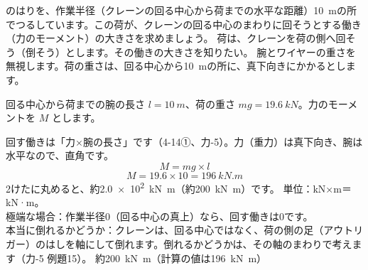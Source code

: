 \begin{phreidai}[腕の根もとを回す働き]\label{ph:力-0:ex3}
のはりを、作業半径（クレーンの回る中心から荷までの水平な距離）\qty{10}{m}の所でつるしています。この荷が、クレーンの回る中心のまわりに回そうとする働き（力のモーメント）の大きさを求めましょう。
\phbamen
荷は、クレーンを荷の側へ回そう（倒そう）とします。その働きの大きさを知りたい。
\phmushi
腕とワイヤーの重さを無視します。荷の重さは、回る中心から\qty{10}{m}の所に、真下向きにかかるとします。
\phzu
\noindent\begin{minipage}[c]{0.52\linewidth}\centering
{}
\end{minipage}\hfill
\begin{minipage}[c]{0.45\linewidth}\raggedright
回る中心から荷までの腕の長さ $l=\qty{10}{m}$、荷の重さ $mg=\qty{19.6}{kN}$。力のモーメントを $M$ とします。
\end{minipage}
\phriyu
回す働きは「力×腕の長さ」です（4-14①、力-5）。力（重力）は真下向き、腕は水平なので、直角です。
\phtateru
\[M=mg\times l\]
\phtoku
\[M=19.6\times10=\qty{196}{kN.m}\]
2けたに丸めると、約\qty{2.0e2}{kN.m}（約\qty{200}{kN.m}）です。
\phtashikame
単位：kN×m＝kN·m。\\
極端な場合：作業半径0（回る中心の真上）なら、回す働きは0です。\\
本当に倒れるかどうか：クレーンは、回る中心ではなく、荷の側の足（アウトリガー）のはしを軸にして倒れます。倒れるかどうかは、その軸のまわりで考えます（力-5 例題15）。
\kotae 約\qty{200}{kN.m}（計算の値は\qty{196}{kN.m}）
\end{phreidai}
